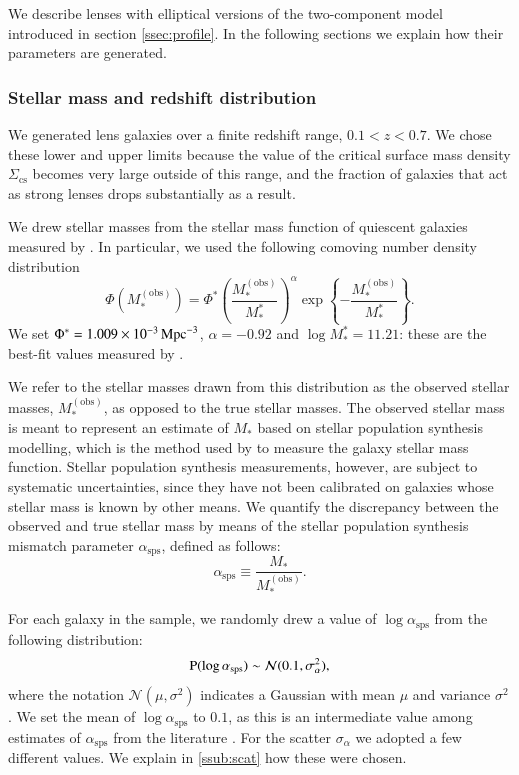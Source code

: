 \documentclass{aa}
\def\mstar{M_*}
\def\asps{\alpha_{\mathrm{sps}}}
\def\mobs{M_*^{(\mathrm{obs})}}
\def\pr{{\rm P}}
\begin{document}
We describe lenses with elliptical versions of the two-component model introduced in section \ref{ssec:profile}.
In the following sections we explain how their parameters are generated.

\subsubsection{Stellar mass and redshift distribution}\label{ssub:mstarz}

We generated lens galaxies over a finite redshift range, $0.1 < z < 0.7$.
We chose these lower and upper limits because the value of the critical surface mass density $\Sigma_{\mathrm{cs}}$ becomes very large outside of this range, and the fraction of galaxies that act as strong lenses drops substantially as a result.

We drew stellar masses from the stellar mass function of quiescent galaxies measured by \citet{Muz++13}.
In particular, we used the following comoving number density distribution
\begin{equation}
\Phi(\mobs) = \Phi^*\left(\frac{\mobs}{\mstar^*}\right)^{\alpha} \exp{\left\{-\frac{\mobs}{\mstar^*}\right\}}.
\end{equation}
We set $\Phi^*=1.009\times10^{-3}\,{\rm Mpc}^{-3}$, $\alpha=-0.92$ and $\log{\mstar^*}=11.21$: these are the best-fit values measured by \citet{Muz++13}.

We refer to the stellar masses drawn from this distribution as the observed stellar masses, $\mobs$, as opposed to the true stellar masses.
The observed stellar mass is meant to represent an estimate of $\mstar$ based on stellar population synthesis modelling, which is the method used by \citet{Muz++13} to measure the galaxy stellar mass function.
Stellar population synthesis measurements, however, are subject to systematic uncertainties, since they have not been calibrated on galaxies whose stellar mass is known by other means.
We quantify the discrepancy between the observed and true stellar mass by means of the stellar population synthesis mismatch parameter $\asps$, defined as follows:
\begin{equation}
\asps \equiv \frac{\mstar}{\mobs}.
\end{equation}

For each galaxy in the sample, we randomly drew a value of $\log{\asps}$ from the following distribution:
\begin{equation}
\pr(\log{\asps}) \sim \mathcal{N}(0.1, \sigma_\alpha^2),
\end{equation}
where the notation $\mathcal{N}(\mu,\sigma^2)$ indicates a Gaussian with mean $\mu$ and variance $\sigma^2$.
We set the mean of $\log{\asps}$ to $0.1$, as this is an intermediate value among estimates of $\asps$ from the literature \citep{CvD12, Cap++13, SLC15, Son++15, Son++19}.
For the scatter $\sigma_\alpha$ we adopted a few different values. We explain in \ref{ssub:scat} how these were chosen.
\end{document}
